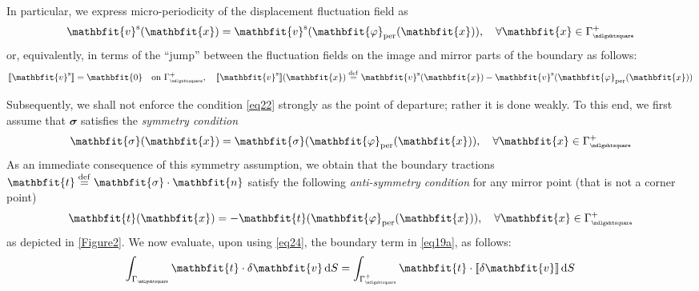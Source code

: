 \documentclass[12pt,a4paper]{article}
\renewcommand{\ta}[1]{\mathbfit{#1}}
\renewcommand{\ts}[1]{\mathbfit{#1}}
\renewcommand{\Box}{\mdlgwhtsquare}
\DeclarePairedDelimiter{\jmp}{[\![}{]\!]}
\newcommand{\per}{\mathrm{per}}
\newcommand{\rve}{
  {\mathchoice
   {\mbox{\scalebox{0.67}{$\Box$}}}
   {\mbox{\scalebox{0.67}{$\Box$}}}
   {\mbox{\scalebox{0.5}{$\Box$}}}
   {\mbox{\scalebox{0.375}{$\Box$}}}
  }
}
\begin{document}
In particular, we express micro-periodicity of the displacement fluctuation field as
\begin{equation}
    \ta v^\fluct(\ta{x}) = \ta v^\fluct(\ta{\varphi}_\per(\ta{x})), \quad
    \forall \ta{x}\in\Gamma_\rve^+
\label{eq21}
\end{equation}
or, equivalently, in terms of the ``jump'' between the fluctuation fields on the image and mirror parts of the boundary as follows:
\begin{equation}
    \jmp{\ta v^\fluct} = \ta{0} \quad \makebox{on } \Gamma_\rve^+, \quad
    \jmp{\ta v^\fluct}(\ta{x}) \defeq \ta v^\fluct(\ta{x})-\ta v^\fluct(\ta{\varphi}_\per(\ta{x}))
\label{eq22}
\end{equation}

Subsequently, we shall not enforce the condition \cref{eq22} strongly as the point of departure; rather it is done weakly.
To this end, we first assume that $\ts{\sigma}$ satisfies the \emph{symmetry condition}
\begin{equation}
    \ts{\sigma}(\ta{x}) = \ts{\sigma}(\ta{\varphi}_\per(\ta{x})), \quad
    \forall \ta{x}\in\Gamma_\rve^+
\label{eq23}
\end{equation}
As an immediate consequence of this symmetry assumption, we obtain that the boundary tractions $\ta{t}\defeq\ts{\sigma}\cdot\ta{n}$ satisfy the following \emph{anti-symmetry condition} for any mirror point (that is not a corner point)
\begin{equation}
    \ta{t}(\ta{x}) = -\ta{t}(\ta{\varphi}_\per(\ta{x})), \quad
    \forall \ta{x}\in\Gamma_\rve^+
\label{eq24}
\end{equation}
as depicted in \cref{Figure2}.
We now evaluate, upon using \cref{eq24}, the boundary term in
\cref{eq19a}, as follows:
\begin{equation}
    \int_{\Gamma_\rve} \ta{t} \cdot \delta \ta v \dif S =
    \int_{\Gamma_\rve^+} \ta{t} \cdot \jmp{\delta \ta v} \dif S
\label{eq25}
\end{equation}
\end{document}
